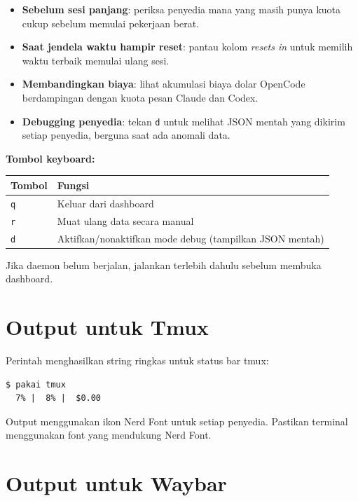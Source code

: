 \begin{itemize}
  \item \textbf{Sebelum sesi panjang}: periksa penyedia mana yang masih punya
        kuota cukup sebelum memulai pekerjaan berat.
  \item \textbf{Saat jendela waktu hampir reset}: pantau kolom \textit{resets in}
        untuk memilih waktu terbaik memulai ulang sesi.
  \item \textbf{Membandingkan biaya}: lihat akumulasi biaya dolar OpenCode
        berdampingan dengan kuota pesan Claude dan Codex.
  \item \textbf{Debugging penyedia}: tekan \texttt{d} untuk melihat JSON mentah
        yang dikirim setiap penyedia, berguna saat ada anomali data.
\end{itemize}

\textbf{Tombol keyboard:}
\begin{center}
\begin{tabular}{ll}
\toprule
\textbf{Tombol} & \textbf{Fungsi} \\
\midrule
\texttt{q} & Keluar dari dashboard \\
\texttt{r} & Muat ulang data secara manual \\
\texttt{d} & Aktifkan/nonaktifkan mode debug (tampilkan JSON mentah) \\
\bottomrule
\end{tabular}
\end{center}

\begin{infobox}
  Jika daemon belum berjalan, jalankan  terlebih dahulu
  sebelum membuka dashboard.
\end{infobox}

\section{Output untuk Tmux}

Perintah  menghasilkan string ringkas untuk status bar tmux:

\begin{lstlisting}[style=terminal]
$ pakai tmux
  7% |  8% |  $0.00
\end{lstlisting}

Output menggunakan ikon Nerd Font untuk setiap penyedia. Pastikan terminal
menggunakan font yang mendukung Nerd Font.

\section{Output untuk Waybar}

